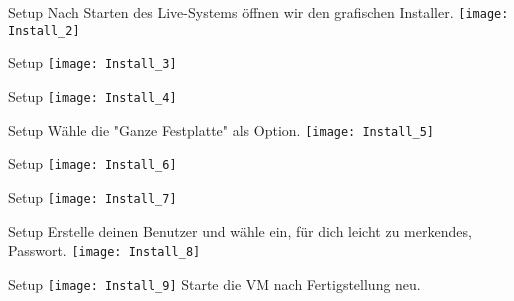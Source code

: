 \begin{frame}{Setup}
    Nach Starten des Live-Systems öffnen wir den grafischen Installer.
    \texttt{[image: Install\_2]}
\end{frame}

\begin{frame}{Setup}
    \texttt{[image: Install\_3]}
\end{frame}

\begin{frame}{Setup}
    \texttt{[image: Install\_4]}
\end{frame}

\begin{frame}{Setup}
    Wähle die "Ganze Festplatte" als Option.
    \texttt{[image: Install\_5]}
\end{frame}

\begin{frame}{Setup}
    \texttt{[image: Install\_6]}
\end{frame}

\begin{frame}{Setup}
    \texttt{[image: Install\_7]}
\end{frame}

\begin{frame}{Setup}
    Erstelle deinen Benutzer und wähle ein, für dich leicht zu merkendes, Passwort.
    \texttt{[image: Install\_8]}
\end{frame}

\begin{frame}{Setup}
    \texttt{[image: Install\_9]}
    \newline
    Starte die VM nach Fertigstellung neu.
\end{frame}